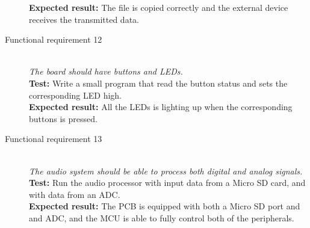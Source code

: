 \begin{description}
        \textbf{Expected result:} The file is copied correctly and the external device receives the
        transmitted data.
    \item[Functional requirement 12] \hfill \\
        \textit{The board should have buttons and LEDs.} \\
        \textbf{Test:} Write a small program that read the button status and sets
        the corresponding LED high. \\
        \textbf{Expected result:} All the LEDs is lighting up when the corresponding buttons is pressed.
    \item[Functional requirement 13] \hfill \\
        \textit{The audio system should be able to process both digital and analog signals.} \\
        \textbf{Test:} Run the audio processor with input data from a Micro SD card, and
        with data from an ADC. \\
        \textbf{Expected result:} The PCB is equipped with both a Micro SD port and and ADC, and the
        MCU is able to fully control both of the peripherals.\\
\end{description}
